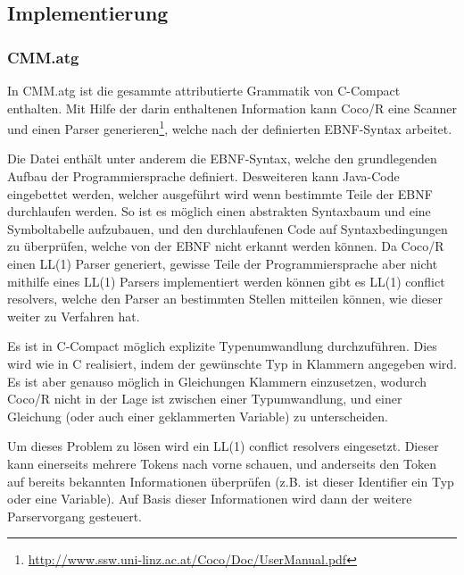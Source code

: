 

\newpage
\subsection{Implementierung}

\subsubsection{CMM.atg}

In CMM.atg ist die gesammte attributierte Grammatik von C-Compact enthalten. Mit Hilfe der darin enthaltenen Information kann Coco/R eine Scanner und einen Parser generieren\footnote{\url{http://www.ssw.uni-linz.ac.at/Coco/Doc/UserManual.pdf}}, welche nach der definierten EBNF-Syntax arbeitet.

Die Datei enth\"alt unter anderem die EBNF-Syntax, welche den grundlegenden Aufbau der Programmiersprache definiert. Desweiteren kann Java-Code eingebettet werden, welcher ausgef\"uhrt wird wenn bestimmte Teile der EBNF durchlaufen werden. So ist es m\"oglich einen abstrakten Syntaxbaum und eine Symboltabelle aufzubauen, und den durchlaufenen Code auf Syntaxbedingungen zu \"uberpr\"ufen, welche von der EBNF nicht erkannt werden k\"onnen. Da Coco/R einen LL(1) Parser generiert, gewisse Teile der Programmiersprache aber nicht mithilfe eines LL(1) Parsers implementiert werden k\"onnen gibt es LL(1) conflict resolvers, welche den Parser an bestimmten Stellen mitteilen k\"onnen, wie dieser weiter zu Verfahren hat.


Es ist in C-Compact m\"oglich explizite Typenumwandlung durchzuf\"uhren. Dies wird wie in C realisiert, indem der gew\"unschte Typ in Klammern angegeben wird. Es ist aber genauso m\"oglich in Gleichungen Klammern einzusetzen, wodurch Coco/R nicht in der Lage ist zwischen einer Typumwandlung, und einer Gleichung (oder auch einer geklammerten Variable) zu unterscheiden.

Um dieses Problem zu l\"osen wird ein LL(1) conflict resolvers eingesetzt. Dieser kann einerseits mehrere Tokens nach vorne schauen, und anderseits den Token auf bereits bekannten Informationen \"uberpr\"ufen (z.B. ist dieser Identifier ein Typ oder eine Variable). Auf Basis dieser Informationen wird dann der weitere Parservorgang gesteuert.

